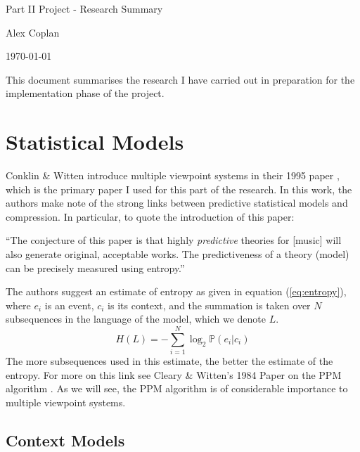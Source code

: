 \documentclass[12pt,a4paper,twoside]{article}
\begin{document}
\cleanlookdateon

\begin{center}
\LARGE
Part II Project - Research Summary

\large
Alex Coplan

\today
\end{center}

\vspace{4mm}

This document summarises the research I have carried out in preparation for the
implementation phase of the project.

\section*{Statistical Models}

Conklin \& Witten introduce multiple viewpoint systems in their 1995 paper
\cite{conklin1995viewpoints}, which is the primary paper I used for this part of
the research.  In this work, the authors make note of the strong links between
predictive statistical models and compression. In particular, to quote the
introduction of this paper:
\begin{adjustwidth}{1em}{}
  ``The conjecture of this paper is that highly \emph{predictive} theories for
  [music] will also generate original, acceptable works. The predictiveness of a
  theory (model) can be precisely measured using entropy.''
\end{adjustwidth}

The authors suggest an estimate of entropy as given in equation
(\ref{eq:entropy}), where $e_i$ is an event, $c_i$ is its context, and the
summation is taken over $N$ subsequences in the language of the model, which we
denote $L$.
\begin{equation}
  H(L) = - \sum_{i = 1}^N \log_2 \mathbb{P}(e_i | c_i) \label{eq:entropy}
\end{equation} 
The more subsequences used in this estimate, the better the estimate of the
entropy. For more on this link see Cleary \& Witten's 1984 Paper on the PPM
algorithm \cite{cleary1984ppm}. As we will see, the PPM algorithm is of
considerable importance to multiple viewpoint systems.

\subsection*{Context Models}
\end{document}
